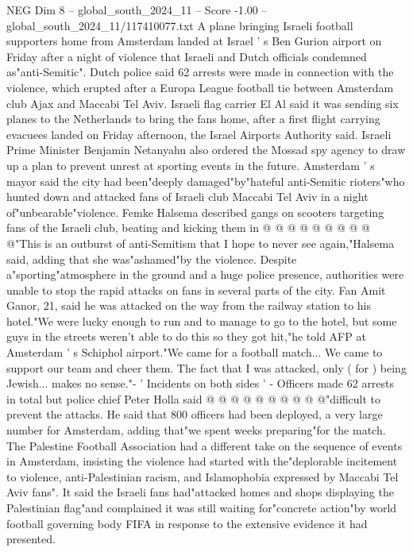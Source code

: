 \begin{textsample}{NEG Dim 8 – global\_south\_2024\_11 – Score -1.00 – global\_south\_2024\_11/117410077.txt}  \label{ex:f8_neg_317}
A plane bringing Israeli football supporters home from Amsterdam landed at Israel ' s Ben Gurion airport on Friday after a night of violence that Israeli and Dutch officials condemned as"anti-Semitic".
Dutch police said 62 arrests were made in connection with the violence, which erupted after a Europa League football tie between Amsterdam club Ajax and Maccabi Tel Aviv.
Israeli flag carrier El Al said it was sending six planes to the Netherlands to bring the fans home, after a first flight carrying evacuees landed on Friday afternoon, the Israel Airports Authority said.
Israeli Prime Minister Benjamin Netanyahu also ordered the Mossad spy agency to draw up a plan to prevent unrest at sporting events in the future.
Amsterdam ' s mayor said the city had been"deeply damaged"by"hateful anti-Semitic rioters"who hunted down and attacked fans of Israeli club Maccabi Tel Aviv in a night of"unbearable"violence.
Femke Halsema described gangs on scooters targeting fans of the Israeli club, beating and kicking them in @ @ @ @ @ @ @ @ @ @"This is an outburst of anti-Semitism that I hope to never see again,"Halsema said, adding that she was"ashamed"by the violence.
Despite a"sporting"atmosphere in the ground and a huge police presence, authorities were unable to stop the rapid attacks on fans in several parts of the city.
Fan Amit Ganor, 21, said he was attacked on the way from the railway station to his hotel."We were lucky enough to run and to manage to go to the hotel, but some guys in the streets weren't able to do this so they got hit,"he told AFP at Amsterdam ' s Schiphol airport."We came for a football match...
We came to support our team and cheer them.
The fact that I was attacked, only ( for ) being Jewish... makes no sense."- ' Incidents on both sides ' - Officers made 62 arrests in total but police chief Peter Holla said @ @ @ @ @ @ @ @ @ @"difficult to prevent the attacks.
He said that 800 officers had been deployed, a very large number for Amsterdam, adding that"we spent weeks preparing"for the match.
The Palestine Football Association had a different take on the sequence of events in Amsterdam, insisting the violence had started with the"deplorable incitement to violence, anti-Palestinian racism, and Islamophobia expressed by Maccabi Tel Aviv fans".
It said the Israeli fans had"attacked homes and shops displaying the Palestinian flag"and complained it was still waiting for"concrete action"by world football governing body FIFA in response to the extensive evidence it had presented.

\end{textsample}

